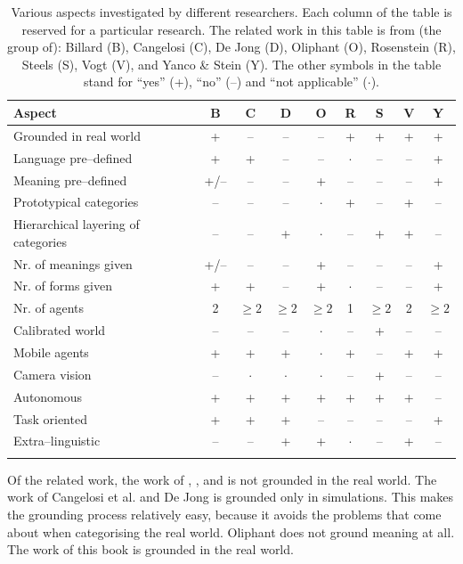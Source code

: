 \begin{table}[t]
\begin{tabular}{>{\raggedright}p{4cm}cccccccc}
\lsptoprule
Aspect & B & C & D & O & R & S & V & Y\\\midrule
Grounded in real world & + & -- & -- & -- & + & + & + & +\\\hline
Language pre--defined & + & + & -- & -- & $\cdot$ & -- & -- & +\\\hline
Meaning pre--defined & +/-- & -- & -- & + & -- & -- & -- & +\\\hline
Prototypical categories & -- & -- & -- & $\cdot$ & + & -- & + & --\\\hline
Hierarchical layering of categories & -- & -- & + & $\cdot$ & -- & + & + & --\\\hline
Nr. of meanings given & +/-- & -- & -- & + & -- & -- & -- & +\\\hline
Nr. of forms given & + & + & -- & + & $\cdot$ & -- & -- & +\\\hline
Nr. of agents & 2 & $\geq 2$ & $\geq 2$ & $\geq 2$ & 1 & $\geq 2$ & 2 & $\geq 2$\\\hline
Calibrated world & -- & -- & -- & $\cdot$ & -- & + & -- & --\\\hline
Mobile agents & + & + & + & $\cdot$ & + & -- & + & +\\\hline
Camera vision & -- & $\cdot$ & $\cdot$ & $\cdot$ & -- & + & -- & --\\\hline
Autonomous & + & + & + & + & + & + & + & --\\\hline
Task oriented & + & + & + & -- & -- & -- & -- & +\\\hline
Extra--linguistic & -- & -- & + & + & $\cdot$ & -- & + & --\\
\lspbottomrule
\end{tabular}
\caption{Various aspects investigated by different researchers. Each column of the table is reserved for a particular research. The related work in this table is from (the group of): Billard (B), Cangelosi (C), De Jong (D), Oliphant (O), Rosenstein (R), Steels (S), Vogt (V), and Yanco \& Stein (Y). The other symbols in the table stand for ``yes'' (+), ``no'' (--) and ``not applicable'' ($\cdot$).}
\label{t:intro:contrib}
\end{table}


Of the related work, the work of \citet{cangelosiparisi:1998}, \citet{dejong:2000}, and \citet{oliphant:1997} is not grounded in the real world. The work of Cangelosi et al. and De Jong is grounded only in simulations. This makes the grounding process relatively easy, because it avoids the problems that come about when categorising the real world. Oliphant does not ground meaning at all. The work of this book is grounded in the real world.

